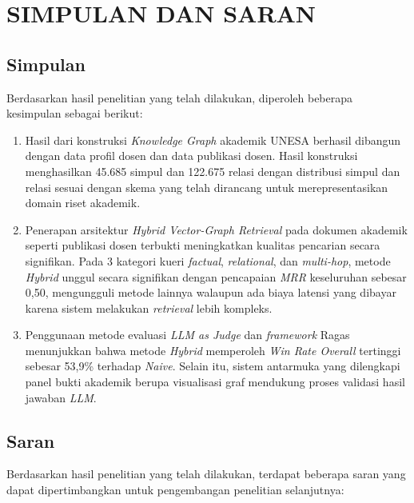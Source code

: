 
\chapter{SIMPULAN DAN SARAN}
\label{chap:simpulan}

\section{Simpulan}
\label{sec:simpulan-bab5}

Berdasarkan hasil penelitian yang telah dilakukan, diperoleh beberapa kesimpulan sebagai berikut:

\begin{enumerate}[label=\arabic*., leftmargin=0.75cm, itemsep=8pt]
      \item Hasil dari konstruksi \textit{Knowledge Graph} akademik UNESA berhasil dibangun dengan data profil dosen dan data publikasi dosen. Hasil konstruksi menghasilkan 45.685 simpul dan 122.675 relasi dengan distribusi simpul dan relasi sesuai dengan skema yang telah dirancang untuk merepresentasikan domain riset akademik.

      \item Penerapan arsitektur \textit{Hybrid Vector-Graph Retrieval} pada dokumen akademik seperti publikasi dosen terbukti meningkatkan kualitas pencarian secara signifikan. Pada 3 kategori kueri \textit{factual}, \textit{relational}, dan \textit{multi-hop}, metode \textit{Hybrid} unggul secara signifikan dengan pencapaian \textit{MRR} keseluruhan sebesar 0,50, mengungguli metode lainnya walaupun ada biaya latensi yang dibayar karena sistem melakukan \textit{retrieval} lebih kompleks.

      \item Penggunaan metode evaluasi \textit{LLM as Judge} dan \textit{framework} Ragas menunjukkan bahwa metode \textit{Hybrid} memperoleh \textit{Win Rate Overall} tertinggi sebesar 53,9\% terhadap \textit{Naive}. Selain itu, sistem antarmuka yang dilengkapi panel bukti akademik berupa visualisasi graf mendukung proses validasi hasil jawaban \textit{LLM}.
\end{enumerate}

\section{Saran}
\label{sec:saran-bab5}

Berdasarkan hasil penelitian yang telah dilakukan, terdapat beberapa saran yang dapat dipertimbangkan untuk pengembangan penelitian selanjutnya:

